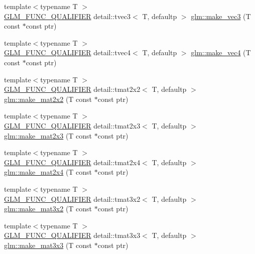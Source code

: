 \begin{DoxyCompactItemize}
\item 
{\footnotesize template$<$typename T $>$ }\\\hyperlink{setup_8hpp_a33fdea6f91c5f834105f7415e2a64407}{G\+L\+M\+\_\+\+F\+U\+N\+C\+\_\+\+Q\+U\+A\+L\+I\+F\+I\+ER} detail\+::tvec3$<$ T, defaultp $>$ \hyperlink{group__gtc__type__ptr_gad91a6a0fe324630b151208703a1591ed}{glm\+::make\+\_\+vec3} (T const $\ast$const ptr)
\item 
{\footnotesize template$<$typename T $>$ }\\\hyperlink{setup_8hpp_a33fdea6f91c5f834105f7415e2a64407}{G\+L\+M\+\_\+\+F\+U\+N\+C\+\_\+\+Q\+U\+A\+L\+I\+F\+I\+ER} detail\+::tvec4$<$ T, defaultp $>$ \hyperlink{group__gtc__type__ptr_ga1b9e0d9ca48d79ba87edc121c1872c44}{glm\+::make\+\_\+vec4} (T const $\ast$const ptr)
\item 
{\footnotesize template$<$typename T $>$ }\\\hyperlink{setup_8hpp_a33fdea6f91c5f834105f7415e2a64407}{G\+L\+M\+\_\+\+F\+U\+N\+C\+\_\+\+Q\+U\+A\+L\+I\+F\+I\+ER} detail\+::tmat2x2$<$ T, defaultp $>$ \hyperlink{group__gtc__type__ptr_ga860d529f631ea6f9a0e510491d29a8ac}{glm\+::make\+\_\+mat2x2} (T const $\ast$const ptr)
\item 
{\footnotesize template$<$typename T $>$ }\\\hyperlink{setup_8hpp_a33fdea6f91c5f834105f7415e2a64407}{G\+L\+M\+\_\+\+F\+U\+N\+C\+\_\+\+Q\+U\+A\+L\+I\+F\+I\+ER} detail\+::tmat2x3$<$ T, defaultp $>$ \hyperlink{group__gtc__type__ptr_gadef48cd950566f23a4b1e47127ee478c}{glm\+::make\+\_\+mat2x3} (T const $\ast$const ptr)
\item 
{\footnotesize template$<$typename T $>$ }\\\hyperlink{setup_8hpp_a33fdea6f91c5f834105f7415e2a64407}{G\+L\+M\+\_\+\+F\+U\+N\+C\+\_\+\+Q\+U\+A\+L\+I\+F\+I\+ER} detail\+::tmat2x4$<$ T, defaultp $>$ \hyperlink{group__gtc__type__ptr_ga174a43e8913682834de9cd918e36df25}{glm\+::make\+\_\+mat2x4} (T const $\ast$const ptr)
\item 
{\footnotesize template$<$typename T $>$ }\\\hyperlink{setup_8hpp_a33fdea6f91c5f834105f7415e2a64407}{G\+L\+M\+\_\+\+F\+U\+N\+C\+\_\+\+Q\+U\+A\+L\+I\+F\+I\+ER} detail\+::tmat3x2$<$ T, defaultp $>$ \hyperlink{group__gtc__type__ptr_gaa40868af4de8c5ed5470fdcc9985dbfc}{glm\+::make\+\_\+mat3x2} (T const $\ast$const ptr)
\item 
{\footnotesize template$<$typename T $>$ }\\\hyperlink{setup_8hpp_a33fdea6f91c5f834105f7415e2a64407}{G\+L\+M\+\_\+\+F\+U\+N\+C\+\_\+\+Q\+U\+A\+L\+I\+F\+I\+ER} detail\+::tmat3x3$<$ T, defaultp $>$ \hyperlink{group__gtc__type__ptr_gaf8ba0a0a523423ae1149a1c2d90eb337}{glm\+::make\+\_\+mat3x3} (T const $\ast$const ptr)

\end{DoxyCompactItemize}
